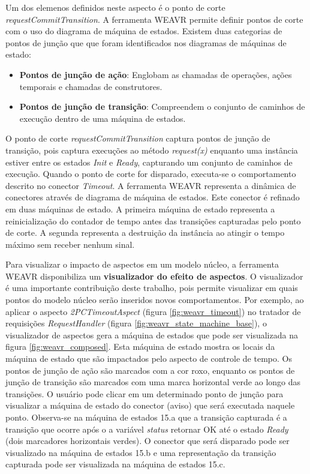 Um dos elemenos definidos neste aspecto é o ponto de corte \textit{requestCommitTransition}. A ferramenta WEAVR permite definir pontos de 
corte com o uso do diagrama de máquina de estados. Existem duas categorias de pontos de junção que que foram identificados nos diagramas de máquinas
de estado:

\begin{itemize}
  \item \textbf{Pontos de junção de ação}: Englobam as chamadas de operações, ações temporais e chamadas de construtores. 
  \item \textbf{Pontos de junção de transição}: Compreendem o conjunto de caminhos de execução dentro de uma máquina de estados.
\end{itemize}

O ponto de corte \textit{requestCommitTransition} captura pontos de junção de transição, pois captura execuções ao método \textit{request(x)} enquanto
uma instância estiver entre os estados \textit{Init} e \textit{Ready}, capturando um conjunto de caminhos de execução. Quando o ponto de corte for
disparado, executa-se o comportamento descrito no conector \textit{Timeout}. A ferramenta WEAVR representa a dinâmica de conectores através de
diagrama de máquina de estados. Este conector é refinado em duas máquinas de estado. A primeira máquina de estado representa a reinicialização do
contador de tempo antes das transições capturadas pelo ponto de corte. A segunda representa a destruição da instância ao atingir o tempo máximo sem
receber nenhum sinal.

Para visualizar o impacto de aspectos em um modelo núcleo, a ferramenta WEAVR disponibiliza um \textbf{visualizador do efeito de aspectos}. O
visualizador é uma importante contribuição deste trabalho, pois permite visualizar em quais pontos do modelo núcleo serão inseridos novos
comportamentos. Por exemplo, ao aplicar o aspecto \textit{2PCTimeoutAspect} (figura \ref{fig:weavr_timeout}) no tratador de requisições \textit{RequestHandler} 
(figura \ref{fig:weavr_state_machine_base}), o visualizador de aspectos gera a máquina de estados que pode ser visualizada na figura
\ref{fig:weavr_composed}. Esta máquina de estado mostra os locais da máquina de estado que são impactados pelo aspecto de controle de tempo. 
Os pontos de junção de ação são marcados com a cor roxo, enquanto os pontos de junção de transição são marcados com uma marca horizontal verde ao
longo das transições. O usuário pode clicar em um determinado ponto de junção para visualizar a máquina de estado do conector (aviso) que será executada 
naquele ponto. Observa-se na máquina de estados 15.a que a transição capturada é a transição que ocorre após o a variável \textit{status} retornar OK
até o estado \textit{Ready} (dois marcadores horizontais verdes). O conector que será disparado pode ser visualizado na máquina de estados 15.b e 
uma representação da transição capturada pode ser visualizada na máquina de estados 15.c.


